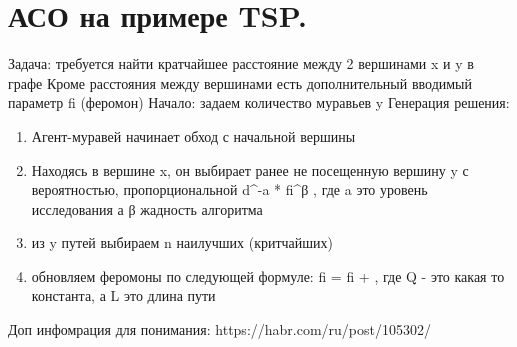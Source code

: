\section{АСО на примере TSP.}
Задача: требуется найти кратчайшее расстояние между 2 вершинами x и y в графе
Кроме расстояния между вершинами есть дополнительный вводимый параметр fi (феромон)
Начало: задаем количество муравьев y 
Генерация решения:
\begin{enumerate} 
	\item Агент-муравей начинает обход с начальной вершины
	\item Находясь в вершине x, он выбирает ранее не посещенную вершину y с вероятностью, пропорциональной d^-a * fi^β , где a это уровень исследования а β жадность алгоритма
	\item из y путей выбираем n наилучших (критчайших)
	\item обновляем феромоны по следующей формуле: fi = fi +  , где Q - это какая то константа, а L это длина пути
\end{enumerate}
Доп инфомрация для понимания: https://habr.com/ru/post/105302/

